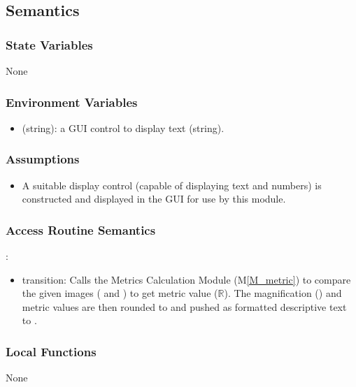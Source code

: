\documentclass[12pt, titlepage]{article}
\newcommand{\mref}[1]{M\ref{#1}}
\newcommand{\mrefp}[1]{(\mref{#1})}
\newcommand{\mreff}[1]{Module \mrefp{#1}}
\begin{document}
\subsection{Semantics}

\subsubsection{State Variables}
None

\subsubsection{Environment Variables}
\begin{itemize}
  \item {} (string): a GUI control to display text (string).
\end{itemize}

\subsubsection{Assumptions}
\begin{itemize}
  \item A suitable display control (capable of displaying text and numbers) is constructed
  and displayed in the GUI for use by this module.
\end{itemize}

\subsubsection{Access Routine Semantics}

\noindent {}:
\begin{itemize}
\item transition: Calls the Metrics Calculation \mreff{M_metric} to compare the given images
  ( and ) to get metric value ($\mathbb{R}$).
  The magnification () and metric values are then rounded to 
  and pushed as formatted descriptive text to .
\end{itemize}

\subsubsection{Local Functions}
None

\newpage
\end{document}

